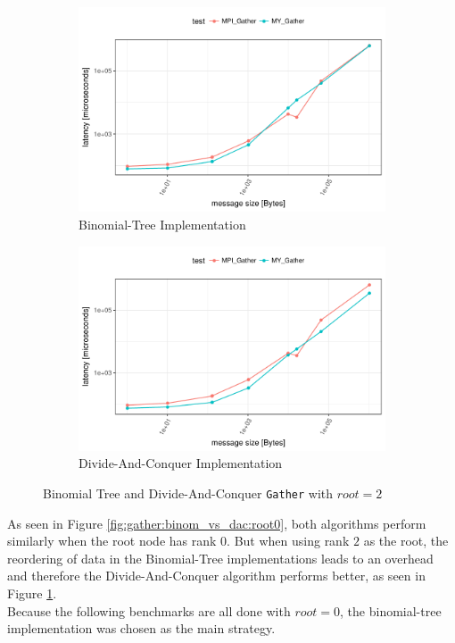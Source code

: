 \begin{figure}[H]
  \centering
  \begin{subfigure}[b]{0.49\textwidth}
        \includegraphics[width=\textwidth]{../benchmarks/openmpi/root=2/binom/gather_32/runtime.pdf}
        \caption{Binomial-Tree Implementation}
    \end{subfigure}
    \begin{subfigure}[b]{0.49\textwidth}
        \includegraphics[width=\textwidth]{../benchmarks/openmpi/root=2/divide_conquer/gather_32/runtime.pdf}
        \caption{Divide-And-Conquer Implementation}
    \end{subfigure}
    \caption{Binomial Tree and Divide-And-Conquer \texttt{Gather} with $root = 2$}
    \label{fig:gather:binom_vs_dac:root2}
\end{figure}

\noindent As seen in Figure \ref{fig:gather:binom_vs_dac:root0}, both algorithms perform similarly when the root node has rank $0$. But when using rank $2$ as the root, the reordering of data in the Binomial-Tree implementations leads to an overhead and therefore the Divide-And-Conquer algorithm performs better, as seen in Figure \ref{fig:gather:binom_vs_dac:root2}.\\
Because the following benchmarks are all done with $root = 0$, the binomial-tree implementation was chosen as the main strategy.

